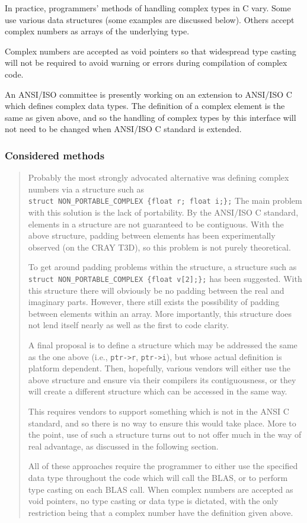 \documentclass{article}
\begin{document}
In practice, programmers' methods of handling complex types in C vary.
Some use various data structures (some examples are discussed below).
Others accept complex numbers as arrays of the underlying type.  

Complex numbers are accepted as void pointers so that widespread type casting
will not be required to avoid warning or errors during compilation of
complex code.

An ANSI/ISO committee is presently working on an extension to ANSI/ISO C
which defines complex data types.  The definition of a complex element
is the same as given above, and so the handling of complex types by this
interface will not need to be changed when ANSI/ISO C standard is
extended.

\subsubsection{Considered methods}
{\it
\begin{quotation}
Probably the most strongly advocated alternative was defining complex numbers
via a structure such as \\
{\tt struct NON\_PORTABLE\_COMPLEX~\{float~r;~float~i;\};}
The main problem with this solution is the lack of portability.  By the
ANSI/ISO C standard, elements in a structure are not guaranteed to be
contiguous.
With the above structure, padding between elements has been experimentally
observed (on the CRAY T3D), so this problem is not purely theoretical.

To get around padding problems within the structure, a structure
such as \\
{\tt struct NON\_PORTABLE\_COMPLEX~\{float~v[2];\};}
has been suggested.  With this
structure there will obviously be no padding
between the real and imaginary parts.  However, there still exists the
possibility of padding between elements within an array.  More importantly, this
structure does not lend itself nearly as well as the first to code clarity.

A final proposal is to define a structure which may be addressed the same
as the one above (i.e., \verb+ptr->r+, \verb+ptr->i+), but whose actual
definition is platform dependent.  Then, hopefully, various vendors will
either use the above structure and ensure via their compilers its
contiguousness, or they will create a different structure which can be
accessed in the same way.

This requires vendors to support something which is not in the ANSI C standard,
and so there is no way to ensure this would take place.  More to the point,
use of such a structure turns out to not offer much in the way of real
advantage, as discussed in the following section.

All of these approaches require the programmer to either use the specified
data type throughout the code which will call the BLAS, or to perform type
casting on each BLAS call.  When complex numbers are accepted as void pointers,
no type casting or data type is dictated, with the only restriction being
that a complex number have the definition given above.
\end{quotation}
}
\end{document}
